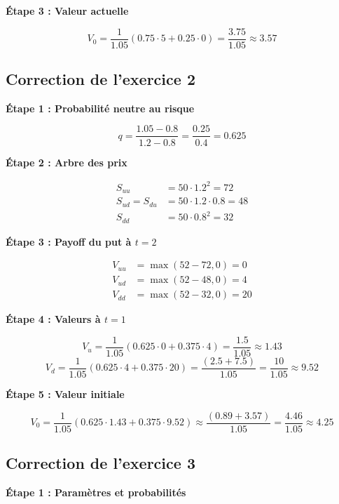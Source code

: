\documentclass[12pt,a4paper]{article}
\begin{document}
\textbf{Étape 3 : Valeur actuelle}

\[
V_0 = \frac{1}{1.05} \left(0.75 \cdot 5 + 0.25 \cdot 0\right) = \frac{3.75}{1.05} \approx \boxed{3.57}
\]

\vspace{0.5cm}

\subsection*{Correction de l’exercice 2}

\textbf{Étape 1 : Probabilité neutre au risque}

\[
q = \frac{1.05 - 0.8}{1.2 - 0.8} = \frac{0.25}{0.4} = 0.625
\]

\textbf{Étape 2 : Arbre des prix}

\[
\begin{aligned}
S_{uu} &= 50 \cdot 1.2^2 = 72 \\
S_{ud} = S_{du} &= 50 \cdot 1.2 \cdot 0.8 = 48 \\
S_{dd} &= 50 \cdot 0.8^2 = 32
\end{aligned}
\]

\textbf{Étape 3 : Payoff du put à $t=2$}

\[
\begin{aligned}
V_{uu} &= \max(52 - 72, 0) = 0 \\
V_{ud} &= \max(52 - 48, 0) = 4 \\
V_{dd} &= \max(52 - 32, 0) = 20
\end{aligned}
\]

\textbf{Étape 4 : Valeurs à $t=1$}

\[
V_u = \frac{1}{1.05} \left(0.625 \cdot 0 + 0.375 \cdot 4\right) = \frac{1.5}{1.05} \approx 1.43
\]
\[
V_d = \frac{1}{1.05} \left(0.625 \cdot 4 + 0.375 \cdot 20\right) = \frac{(2.5 + 7.5)}{1.05} = \frac{10}{1.05} \approx 9.52
\]

\textbf{Étape 5 : Valeur initiale}

\[
V_0 = \frac{1}{1.05} \left(0.625 \cdot 1.43 + 0.375 \cdot 9.52\right) \approx \frac{(0.89 + 3.57)}{1.05} = \frac{4.46}{1.05} \approx \boxed{4.25}
\]

\vspace{0.5cm}

\subsection*{Correction de l’exercice 3}

\textbf{Étape 1 : Paramètres et probabilités}
\end{document}
